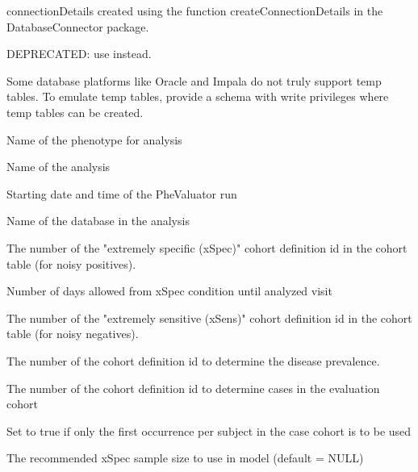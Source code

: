 \documentclass[a4paper]{book}
\begin{document}
%
\begin{Arguments}
\begin{ldescription}
\item[\code{connectionDetails}] connectionDetails created using the function
createConnectionDetails in the DatabaseConnector package.

\item[\code{oracleTempSchema}] DEPRECATED: use  instead.

\item[\code{tempEmulationSchema}] Some database platforms like Oracle and Impala do not truly support temp tables. To
emulate temp tables, provide a schema with write privileges where temp tables
can be created.

\item[\code{phenotype}] Name of the phenotype for analysis

\item[\code{analysisName}] Name of the analysis

\item[\code{runDateTime}] Starting date and time of the PheValuator run

\item[\code{databaseId}] Name of the database in the analysis

\item[\code{xSpecCohortId}] The number of the "extremely specific (xSpec)" cohort
definition id in the cohort table (for noisy positives).

\item[\code{daysFromxSpec}] Number of days allowed from xSpec condition until analyzed visit

\item[\code{xSensCohortId}] The number of the "extremely sensitive (xSens)" cohort
definition id in the cohort table (for noisy negatives).

\item[\code{prevalenceCohortId}] The number of the cohort definition id to determine the
disease prevalence.

\item[\code{caseCohortId}] The number of the cohort definition id to determine cases in the evaluation cohort

\item[\code{caseFirstOccurrenceOnly}] Set to true if only the first occurrence per subject in the case cohort is to be used

\item[\code{xSpecCohortSize}] The recommended xSpec sample size to use in model (default = NULL)


\end{ldescription}
\end{Arguments}
\end{document}

